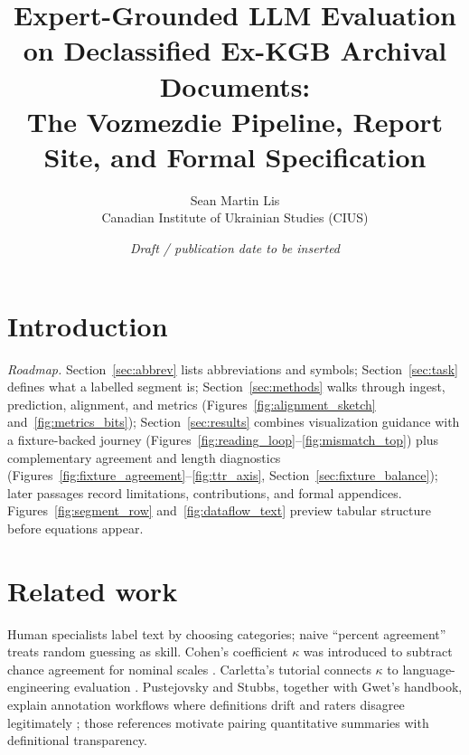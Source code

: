 \documentclass[11pt,a4paper]{article}
\title{Expert-Grounded LLM Evaluation on Declassified Ex-KGB Archival Documents:\\
The Vozmezdie Pipeline, Report Site, and Formal Specification}
\author{Sean Martin Lis\\
Canadian Institute of Ukrainian Studies (CIUS)}
\date{\textit{Draft / publication date to be inserted}}
\theoremstyle{remark}
\begin{document}
\maketitle

\section{Introduction}
\label{sec:intro}

\begin{center}
\end{center}

\vspace{1ex}
\noindent\textit{Roadmap.} Section~\ref{sec:abbrev} lists abbreviations and symbols; Section~\ref{sec:task} defines what a labelled segment is; Section~\ref{sec:methods} walks through ingest, prediction, alignment, and metrics (Figures~\ref{fig:alignment_sketch} and~\ref{fig:metrics_bits}); Section~\ref{sec:results} combines visualization guidance with a fixture-backed journey (Figures~\ref{fig:reading_loop}--\ref{fig:mismatch_top}) plus complementary agreement and length diagnostics (Figures~\ref{fig:fixture_agreement}--\ref{fig:ttr_axis}, Section~\ref{sec:fixture_balance}); later passages record limitations, contributions, and formal appendices. Figures~\ref{fig:segment_row} and~\ref{fig:dataflow_text} preview tabular structure before equations appear.

\section*{Related work}
Human specialists label text by choosing categories; naive ``percent agreement'' treats random guessing as skill. Cohen's coefficient $\kappa$ was introduced to subtract chance agreement for nominal scales \citep{cohen1960coefficient}. Carletta's tutorial connects $\kappa$ to language-engineering evaluation \citep{carletta1996assessing}. Pustejovsky and Stubbs, together with Gwet's handbook, explain annotation workflows where definitions drift and raters disagree legitimately \citep{pustejovsky2012natural,gwet2021handbook}; those references motivate pairing quantitative summaries with definitional transparency.
\end{document}
